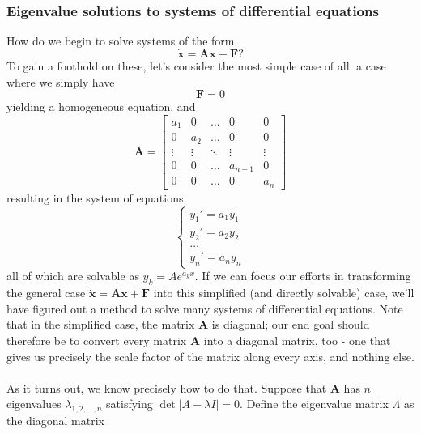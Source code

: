 \documentclass{article}
\begin{document}
\subsubsection{Eigenvalue solutions to systems of differential equations}
How do we begin to solve systems of the form 
\begin{equation*}
    \dot{\mathbf{x}} = \mathbf{A}\mathbf{x} + \mathbf{F}?
\end{equation*}
To gain a foothold on these, let's consider the most simple case of all: a case where we simply have 
\begin{equation*}
    \mathbf{F} = 0
\end{equation*}
yielding a homogeneous equation, and 
\begin{equation*}
    \mathbf{A}=\begin{bmatrix}
        a_1 & 0 & \dots & 0 & 0 \\
        0 & a_2 & \dots & 0 & 0 \\
        \vdots & \vdots & \ddots & \vdots & \vdots \\
        0 & 0 & \dots & a_{n-1} & 0 \\
        0 & 0 & \dots & 0 & a_n
    \end{bmatrix}
\end{equation*}
resulting in the system of equations 
\begin{equation*}
    \begin{cases}
        y_1' = a_1 y_1 \\
        y_2' = a_2 y_2 \\
        \dots \\
        y_n' = a_n y_n
    \end{cases}
\end{equation*}
all of which are solvable as $y_k = Ae^{a_k x}$. If we can focus our efforts in transforming the general case $\dot{\mathbf{x}} = \mathbf{A}\mathbf{x} + \mathbf{F}$ into this simplified (and directly solvable) case, we'll have figured out a method to solve many systems of differential equations. Note that in the simplified case, the matrix $\mathbf{A}$ is diagonal; our end goal should therefore be to convert every matrix $\mathbf{A}$ into a diagonal matrix, too - one that gives us precisely the scale factor of the matrix along every axis, and nothing else. \\ \\
As it turns out, we know precisely how to do that. Suppose that $\mathbf{A}$ has $n$ eigenvalues $\lambda_{1,2,\dots,n}$ satisfying $\det |A-\lambda I|=0$. Define the eigenvalue matrix $\Lambda$ as the diagonal matrix
\end{document}
